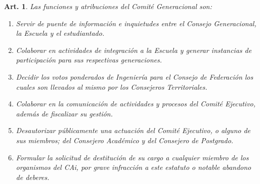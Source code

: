 \documentclass[letterpaper,11pt]{article}
\theoremstyle{plain}
\newtheorem{art}{Art.} %
\begin{document}
		\begin{art}\label{funcionesComiteGeneracional}
			Las funciones y atribuciones del Comité Generacional son:
			\begin{enumerate}
				\item Servir de puente de información e inquietudes entre el Consejo Generacional, la Escuela y el estudiantado.
				\item Colaborar en actividades de integración a la Escuela y generar instancias de participación para sus respectivas generaciones.
				\item Decidir los votos ponderados de Ingeniería para el Consejo de Federación los cuales son llevados al mismo por los Consejeros Territoriales.
				\item Colaborar en la comunicación de actividades y procesos del Comité Ejecutivo, además de fiscalizar su gestión.
				\item Desautorizar públicamente una actuación del Comité Ejecutivo, o alguno de sus miembros; del Consejero Académico y del Consejero de Postgrado.
				\item Formular la solicitud de destitución de su cargo a cualquier miembro de los organismos del CAi, por grave infracción a este estatuto o notable abandono de deberes.
			\end{enumerate}
		\end{art}
\end{document}
